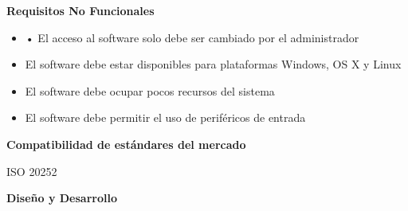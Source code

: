 \documentclass[10pt,a4paper]{article}
\begin{document}
\textbf{Requisitos No Funcionales}
\vspace{\baselineskip}
\begin{itemize}
\item •	El acceso al software solo debe ser cambiado por el administrador
\item El software debe estar disponibles para plataformas Windows, OS X y Linux
\item El software debe ocupar pocos recursos del sistema
\item El software debe permitir el uso de periféricos de entrada
\end{itemize}

\textbf{Compatibilidad de estándares del mercado}
\vspace{\baselineskip}

ISO 20252



\vspace{\baselineskip}
\vspace{\baselineskip}
\vspace{\baselineskip}
\vspace{\baselineskip}
\vspace{\baselineskip}
\vspace{\baselineskip}


\textbf{Diseño y Desarrollo}
\vspace{\baselineskip}
\end{document}
